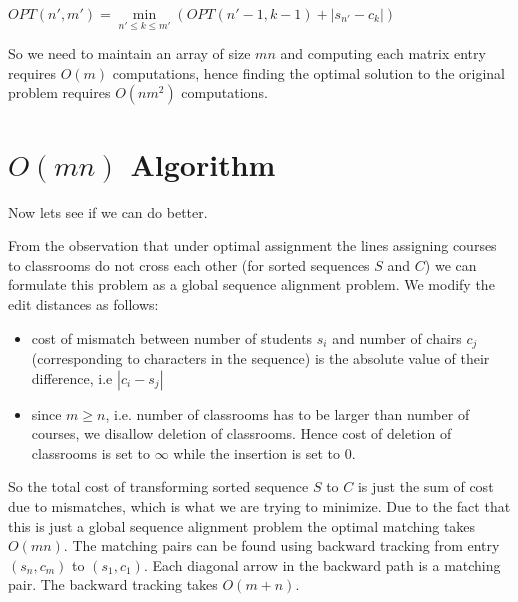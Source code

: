 \begin{center}
  $OPT(n', m') = \min\limits_{n'\leq k \leq m'} (OPT(n'-1, k-1) + |s_{n'} - c_{k}|)$
\end{center}


So we need to maintain an array of size $mn$ and computing each matrix entry requires $O(m)$ computations, hence finding the optimal solution to the original problem requires $O(nm^2)$ computations.

\section{$O(mn)$ Algorithm}

Now lets see if we can do better.

From the observation that under optimal assignment the lines assigning courses to classrooms do not cross each other (for sorted sequences $S$ and $C$) we can formulate this problem as a global sequence alignment problem. We modify the edit distances as follows:

\begin{itemize}
\item cost of mismatch between number of students $s_i$ and number of chairs $c_j$ (corresponding to characters in the sequence) is the absolute value of their difference, i.e $| c_i - s_j |$
\item since $m \geq n$, i.e. number of classrooms has to be larger than number of courses, we disallow deletion of classrooms. Hence cost of deletion of classrooms is set to $\infty$ while the insertion is set to 0.
\end{itemize}

So the total cost of transforming sorted sequence $S$ to $C$ is just the sum of cost due to mismatches, which is what we are trying to minimize. Due to the fact that this is just a global sequence alignment problem the optimal matching takes $O(mn)$. The matching pairs can be found using backward tracking from entry $(s_n, c_m)$ to $(s_1, c_1)$. Each diagonal arrow in the backward path is a matching pair. The backward tracking takes $O(m + n)$.

